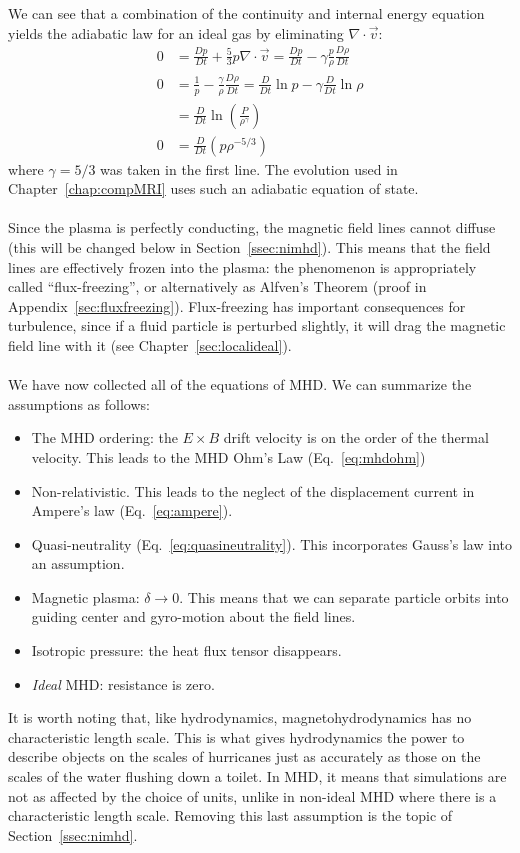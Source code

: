 We can see that a combination of the continuity and internal energy equation yields the adiabatic law for an ideal gas by eliminating $\nabla\cdot\vec v$:
\begin{align}
  0&=\frac{Dp}{Dt}+\frac53p\nabla\cdot\vec v=\frac{Dp}{Dt}-\gamma\frac p\rho\frac{D\rho}{Dt}\nonumber\\
  0&=\frac1p-\frac\gamma\rho\frac{D\rho}{Dt}=\frac{D}{Dt}\ln p-\gamma\frac{D}{Dt}\ln\rho\nonumber\\
  &=\frac{D}{Dt}\ln\left(\frac{P}{\rho^\gamma}\right)\nonumber\\
  0&=\frac{D}{Dt}\left(p\rho^{-5/3}\right)\label{eq:adiabaticgas}
\end{align}
where $\gamma=5/3$ was taken in the first line. The evolution used in Chapter~\ref{chap:compMRI} uses such an adiabatic equation of state.\\
\\
Since the plasma is perfectly conducting, the magnetic field lines cannot diffuse (this will be changed below in Section~\ref{ssec:nimhd}). This means that the field lines are effectively frozen into the plasma: the phenomenon is appropriately called ``flux-freezing'', or alternatively as Alfven's Theorem (proof in Appendix~\ref{sec:fluxfreezing}). Flux-freezing has important consequences for turbulence, since if a fluid particle is perturbed slightly, it will drag the magnetic field line with it (see Chapter~\ref{sec:localideal}).\\
\\
We have now collected all of the equations of MHD. We can summarize the assumptions as follows:
\begin{itemize}
  \item The MHD ordering: the $E\times B$ drift velocity is on the order of the thermal velocity. This leads to the MHD Ohm's Law (Eq.~\ref{eq:mhdohm}) 
  \item Non-relativistic. This leads to the neglect of the displacement current in Ampere's law (Eq.~\ref{eq:ampere}).
  \item Quasi-neutrality (Eq.~\ref{eq:quasineutrality}). This incorporates Gauss's law into an assumption.
  \item Magnetic plasma: $\delta\to0$. This means that we can separate particle orbits into guiding center and gyro-motion about the field lines.
  \item Isotropic pressure: the heat flux tensor disappears.
  \item \textit{Ideal} MHD: resistance is zero.
\end{itemize}
It is worth noting that, like hydrodynamics, magnetohydrodynamics has no characteristic length scale. This is what gives hydrodynamics the power to describe objects on the scales of hurricanes just as accurately as those on the scales of the water flushing down a toilet. In MHD, it means that simulations are not as affected by the choice of units, unlike in non-ideal MHD where there is a characteristic length scale. Removing this last assumption is the topic of Section~\ref{ssec:nimhd}.

